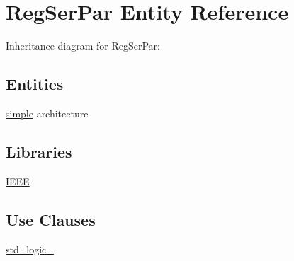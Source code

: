 \hypertarget{class_reg_ser_par}{}\section{Reg\+Ser\+Par Entity Reference}
\label{class_reg_ser_par}


Inheritance diagram for Reg\+Ser\+Par\+:
\subsection*{Entities}
\begin{DoxyCompactItemize}
\item 
\hyperlink{class_reg_ser_par_1_1simple}{simple} architecture
\end{DoxyCompactItemize}
\subsection*{Libraries}
 \begin{DoxyCompactItemize}
\item 
\hyperlink{class_reg_ser_par_ae4f03c286607f3181e16b9aa12d0c6d4}{I\+E\+E\+E} 
\end{DoxyCompactItemize}
\subsection*{Use Clauses}
 \begin{DoxyCompactItemize}
\item 
\hyperlink{class_reg_ser_par_acd03516902501cd1c7296a98e22c6fcb}{std\+\_\+logic\+\_}   
\end{DoxyCompactItemize}
